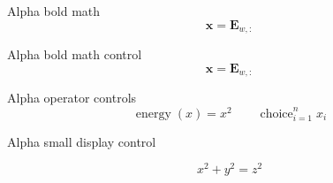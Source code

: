 \documentclass{beamer}
\DeclareMathOperator{\energy}{energy}
\DeclareMathOperator*{\choice}{choice}
\begin{document}
\begin{frame}{Alpha bold math}
\[\bm{x}=\bm{E}_{w,:}\]
\end{frame}
\begin{frame}{Alpha bold math control}
\[\boldsymbol{x}=\mathbf{E}_{w,:}\]
\end{frame}
\begin{frame}{Alpha operator controls}
\[\energy(x)=x^2\qquad\choice_{i=1}^{n}x_i\]
\end{frame}
\begin{frame}{Alpha small display control}
\begin{small}
\[x^2+y^2=z^2\]
\end{small}
\end{frame}
\end{document}
